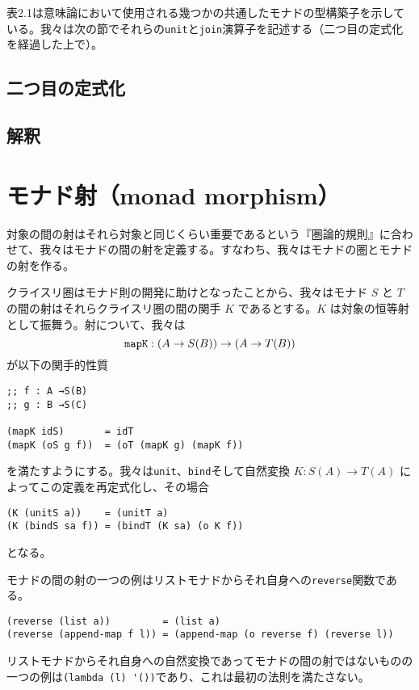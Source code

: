 \documentclass[11pt, oneside]{jsbook}   	%
\begin{document}
表2.1は意味論において使用される幾つかの共通したモナドの型構築子を示している。我々は次の節でそれらの\verb|unit|と\verb|join|演算子を記述する（二つ目の定式化を経過した上で）。
\subsection{ 二つ目の定式化 }
\subsection{ 解釈 }

\newpage

\newpage

\newpage

\section{ モナド射（monad morphism） }
対象の間の射はそれら対象と同じくらい重要であるという『圏論的規則』に合わせて、我々はモナドの間の射を定義する。すなわち、我々はモナドの圏とモナドの射を作る。

クライスリ圏はモナド則の開発に助けとなったことから、我々はモナド $S$ と $T$ の間の射はそれらクライスリ圏の間の関手 $K$ であるとする。$K$ は対象の恒等射として振舞う。射について、我々は
$$
\verb|mapK| : (A \rightarrow S(B)) \rightarrow (A \rightarrow T(B))
$$
が以下の関手的性質
\begin{lstlisting}
;; f : A →S(B)
;; g : B →S(C)

(mapK idS)       = idT   
(mapK (oS g f))  = (oT (mapK g) (mapK f))
\end{lstlisting}
を満たすようにする。我々は\verb|unit|、\verb|bind|そして自然変換 $K : S(A) \rightarrow T(A)$ によってこの定義を再定式化し、その場合
\begin{lstlisting}
(K (unitS a))    = (unitT a)
(K (bindS sa f)) = (bindT (K sa) (o K f))
\end{lstlisting}
となる。

モナドの間の射の一つの例はリストモナドからそれ自身への\verb|reverse|関数である。
\begin{lstlisting}
(reverse (list a))         = (list a)
(reverse (append-map f l)) = (append-map (o reverse f) (reverse l))
\end{lstlisting}
リストモナドからそれ自身への自然変換であってモナドの間の射ではないものの一つの例は\verb|(lambda (l) '())|であり、これは最初の法則を満たさない。
\end{document}

